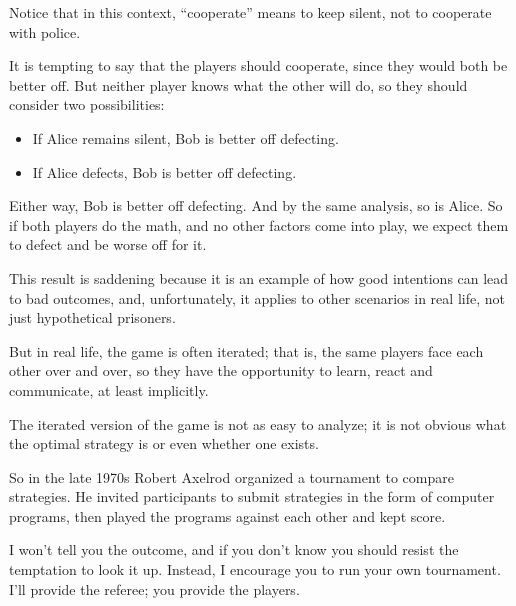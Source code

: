 \documentclass[10pt]{book}
\begin{document}
Notice that in this context, ``cooperate'' means to keep silent,
not to cooperate with police.

It is tempting to say that the players should cooperate, since
they would both be better off.  But neither player knows
what the other will do, so they should consider two possibilities:

\begin{itemize}

\item If Alice remains silent, Bob is better off defecting.

\item If Alice defects, Bob is better off defecting.

\end{itemize}

Either way, Bob is better off defecting.  And by the same analysis, so
is Alice.  So if both players do the math, and no other factors come
into play, we expect them to defect and be worse off for it.

This result is saddening because it is an example of how good intentions
can lead to bad outcomes, and, unfortunately, it applies to other
scenarios in real life, not just hypothetical prisoners.

But in real life, the game is often iterated; that is, the same
players face each other over and over, so they have the opportunity
to learn, react and communicate, at least implicitly.

The iterated version of the game is not as easy to analyze; it
is not obvious what the optimal strategy is or even whether one
exists.

So in the late 1970s Robert Axelrod organized a tournament to compare
strategies.  He invited participants to submit strategies in the
form of computer programs, then played the programs against each other
and kept score.

I won't tell you the outcome, and if you don't know you should resist
the temptation to look it up.  Instead, I encourage you to run your
own tournament.  I'll provide the referee; you provide the players.
\end{document}
